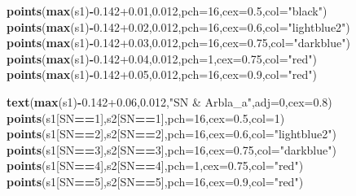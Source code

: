 \documentclass[]{article}
\newenvironment{Shaded}{\begin{snugshade}}{\end{snugshade}}
\newcommand{\DataTypeTok}[1]{\textcolor[rgb]{0.13,0.29,0.53}{#1}}
\newcommand{\DecValTok}[1]{\textcolor[rgb]{0.00,0.00,0.81}{#1}}
\newcommand{\FloatTok}[1]{\textcolor[rgb]{0.00,0.00,0.81}{#1}}
\newcommand{\KeywordTok}[1]{\textcolor[rgb]{0.13,0.29,0.53}{\textbf{#1}}}
\newcommand{\NormalTok}[1]{#1}
\newcommand{\OperatorTok}[1]{\textcolor[rgb]{0.81,0.36,0.00}{\textbf{#1}}}
\newcommand{\StringTok}[1]{\textcolor[rgb]{0.31,0.60,0.02}{#1}}
\begin{document}
\begin{Shaded}
\begin{Highlighting}[]
\KeywordTok{points}\NormalTok{(}\KeywordTok{max}\NormalTok{(s1)}\OperatorTok{-}\FloatTok{0.142+0.01}\NormalTok{,}\FloatTok{0.012}\NormalTok{,}\DataTypeTok{pch=}\DecValTok{16}\NormalTok{,}\DataTypeTok{cex=}\FloatTok{0.5}\NormalTok{,}\DataTypeTok{col=}\StringTok{"black"}\NormalTok{)}
\KeywordTok{points}\NormalTok{(}\KeywordTok{max}\NormalTok{(s1)}\OperatorTok{-}\FloatTok{0.142+0.02}\NormalTok{,}\FloatTok{0.012}\NormalTok{,}\DataTypeTok{pch=}\DecValTok{16}\NormalTok{,}\DataTypeTok{cex=}\FloatTok{0.6}\NormalTok{,}\DataTypeTok{col=}\StringTok{"lightblue2"}\NormalTok{)}
\KeywordTok{points}\NormalTok{(}\KeywordTok{max}\NormalTok{(s1)}\OperatorTok{-}\FloatTok{0.142+0.03}\NormalTok{,}\FloatTok{0.012}\NormalTok{,}\DataTypeTok{pch=}\DecValTok{16}\NormalTok{,}\DataTypeTok{cex=}\FloatTok{0.75}\NormalTok{,}\DataTypeTok{col=}\StringTok{"darkblue"}\NormalTok{)}
\KeywordTok{points}\NormalTok{(}\KeywordTok{max}\NormalTok{(s1)}\OperatorTok{-}\FloatTok{0.142+0.04}\NormalTok{,}\FloatTok{0.012}\NormalTok{,}\DataTypeTok{pch=}\DecValTok{1}\NormalTok{,}\DataTypeTok{cex=}\FloatTok{0.75}\NormalTok{,}\DataTypeTok{col=}\StringTok{"red"}\NormalTok{)}
\KeywordTok{points}\NormalTok{(}\KeywordTok{max}\NormalTok{(s1)}\OperatorTok{-}\FloatTok{0.142+0.05}\NormalTok{,}\FloatTok{0.012}\NormalTok{,}\DataTypeTok{pch=}\DecValTok{16}\NormalTok{,}\DataTypeTok{cex=}\FloatTok{0.9}\NormalTok{,}\DataTypeTok{col=}\StringTok{"red"}\NormalTok{)}

\KeywordTok{text}\NormalTok{(}\KeywordTok{max}\NormalTok{(s1)}\OperatorTok{-}\FloatTok{0.142+0.06}\NormalTok{,}\FloatTok{0.012}\NormalTok{,}\StringTok{"SN & Arbla_a"}\NormalTok{,}\DataTypeTok{adj=}\DecValTok{0}\NormalTok{,}\DataTypeTok{cex=}\FloatTok{0.8}\NormalTok{)}
\KeywordTok{points}\NormalTok{(s1[SN}\OperatorTok{==}\DecValTok{1}\NormalTok{],s2[SN}\OperatorTok{==}\DecValTok{1}\NormalTok{],}\DataTypeTok{pch=}\DecValTok{16}\NormalTok{,}\DataTypeTok{cex=}\FloatTok{0.5}\NormalTok{,}\DataTypeTok{col=}\DecValTok{1}\NormalTok{)}
\KeywordTok{points}\NormalTok{(s1[SN}\OperatorTok{==}\DecValTok{2}\NormalTok{],s2[SN}\OperatorTok{==}\DecValTok{2}\NormalTok{],}\DataTypeTok{pch=}\DecValTok{16}\NormalTok{,}\DataTypeTok{cex=}\FloatTok{0.6}\NormalTok{,}\DataTypeTok{col=}\StringTok{"lightblue2"}\NormalTok{)}
\KeywordTok{points}\NormalTok{(s1[SN}\OperatorTok{==}\DecValTok{3}\NormalTok{],s2[SN}\OperatorTok{==}\DecValTok{3}\NormalTok{],}\DataTypeTok{pch=}\DecValTok{16}\NormalTok{,}\DataTypeTok{cex=}\FloatTok{0.75}\NormalTok{,}\DataTypeTok{col=}\StringTok{"darkblue"}\NormalTok{)}
\KeywordTok{points}\NormalTok{(s1[SN}\OperatorTok{==}\DecValTok{4}\NormalTok{],s2[SN}\OperatorTok{==}\DecValTok{4}\NormalTok{],}\DataTypeTok{pch=}\DecValTok{1}\NormalTok{,}\DataTypeTok{cex=}\FloatTok{0.75}\NormalTok{,}\DataTypeTok{col=}\StringTok{"red"}\NormalTok{)}
\KeywordTok{points}\NormalTok{(s1[SN}\OperatorTok{==}\DecValTok{5}\NormalTok{],s2[SN}\OperatorTok{==}\DecValTok{5}\NormalTok{],}\DataTypeTok{pch=}\DecValTok{16}\NormalTok{,}\DataTypeTok{cex=}\FloatTok{0.9}\NormalTok{,}\DataTypeTok{col=}\StringTok{"red"}\NormalTok{)}


\end{Highlighting}
\end{Shaded}
\end{document}
